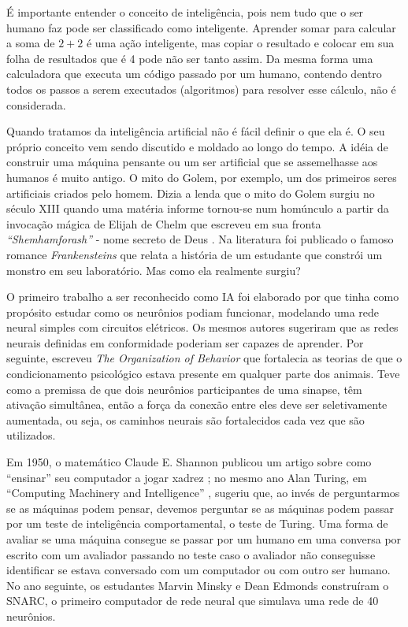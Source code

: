 \documentclass[
]{book}
\begin{document}
É importante entender o conceito de inteligência, pois nem tudo que o ser humano faz pode ser classificado como inteligente. Aprender somar para calcular a soma de \(2+2\) é uma ação inteligente, mas copiar o resultado e colocar em sua folha de resultados que é 4 pode não ser tanto assim. Da mesma forma uma calculadora que executa um código passado por um humano, contendo dentro todos os passos a serem executados (algoritmos) para resolver esse cálculo, não é considerada.

Quando tratamos da inteligência artificial não é fácil definir o que ela é. O seu próprio conceito vem sendo discutido e moldado ao longo do tempo. A idéia de construir uma máquina pensante ou um ser artificial que se assemelhasse aos humanos é muito antigo. O mito do Golem, por exemplo, um dos primeiros seres artificiais criados pelo homem. Dizia a lenda que o mito do Golem surgiu no século XIII quando uma matéria informe tornou-se num homúnculo a partir da invocação mágica de Elijah de Chelm que escreveu em sua fronta \emph{``Shemhamforash''} - nome secreto de Deus \citep{moser2006golem}. Na literatura foi publicado o famoso romance \emph{Frankensteins} \citep{shelley1818frankenstein} que relata a história de um estudante que constrói um monstro em seu laboratório. Mas como ela realmente surgiu?

O primeiro trabalho a ser reconhecido como IA foi elaborado por \citet{mcculloch1943logical} que tinha como propósito estudar como os neurônios podiam funcionar, modelando uma rede neural simples com circuitos elétricos. Os mesmos autores sugeriram que as redes neurais definidas em conformidade poderiam ser capazes de aprender. Por seguinte, \citet{hebb1949organization} escreveu \emph{The Organization of Behavior} que fortalecia as teorias de que o condicionamento psicológico estava presente em qualquer parte dos animais. Teve como a premissa de que dois neurônios participantes de uma sinapse, têm ativação simultânea, então a força da conexão entre eles deve ser seletivamente aumentada, ou seja, os caminhos neurais são fortalecidos cada vez que são utilizados.

Em 1950, o matemático Claude E. Shannon publicou um artigo sobre como ``ensinar'' seu computador a jogar xadrez \citep{shannon1950xxii}; no mesmo ano Alan Turing, em ``Computing Machinery and Intelligence'' \citep{turing1950computing},
sugeriu que, ao invés de perguntarmos se as máquinas podem pensar, devemos perguntar se as máquinas podem passar por um teste de inteligência comportamental, o teste de Turing. Uma forma de avaliar se uma máquina consegue se passar por um humano em uma conversa por escrito com um avaliador passando no teste caso o avaliador não conseguisse identificar se estava conversado com um computador ou com outro ser humano. No ano seguinte, os estudantes Marvin Minsky e Dean Edmonds construíram o SNARC, o primeiro computador de rede neural que simulava uma rede de 40 neurônios.
\end{document}
